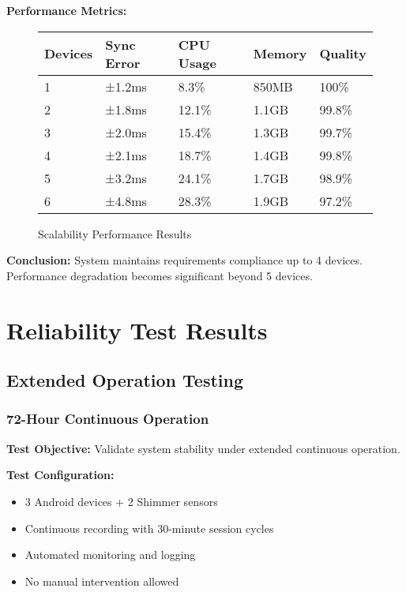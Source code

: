 \textbf{Performance Metrics:}
\begin{figure}[htbp]
\centering
\caption{Scalability Performance Results}
\begin{tabular}{|l|l|l|l|l|}
\hline
\textbf{Devices} & \textbf{Sync Error} & \textbf{CPU Usage} & \textbf{Memory} & \textbf{Quality} \\
\hline
1 & ±1.2ms & 8.3\% & 850MB & 100\% \\
2 & ±1.8ms & 12.1\% & 1.1GB & 99.8\% \\
3 & ±2.0ms & 15.4\% & 1.3GB & 99.7\% \\
4 & ±2.1ms & 18.7\% & 1.4GB & 99.8\% \\
5 & ±3.2ms & 24.1\% & 1.7GB & 98.9\% \\
6 & ±4.8ms & 28.3\% & 1.9GB & 97.2\% \\
\hline
\end{tabular}
\end{figure}

\textbf{Conclusion:} System maintains requirements compliance up to 4 devices. Performance degradation becomes significant beyond 5 devices.

\section{Reliability Test Results}

\subsection{Extended Operation Testing}

\subsubsection{72-Hour Continuous Operation}

\textbf{Test Objective:} Validate system stability under extended continuous operation.

\textbf{Test Configuration:}
\begin{itemize}
\item 3 Android devices + 2 Shimmer sensors
\item Continuous recording with 30-minute session cycles
\item Automated monitoring and logging
\item No manual intervention allowed
\end{itemize}

